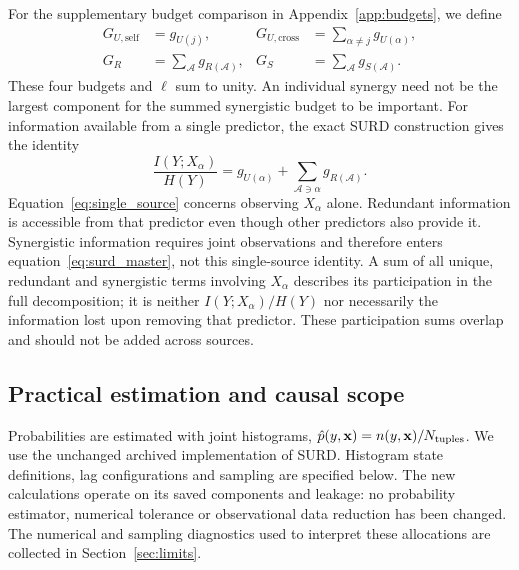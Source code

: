 \documentclass[fleqn,usenatbib]{mnras}
\begin{document}
For the supplementary budget comparison in Appendix~\ref{app:budgets}, we define
\begin{equation}
\begin{aligned}
G_{U,\mathrm{self}}&=g_{U(j)},&
G_{U,\mathrm{cross}}&=\sum_{\alpha\ne j}g_{U(\alpha)},\\
G_R&=\sum_{\mathcal{A}}g_{R(\mathcal{A})},&
G_S&=\sum_{\mathcal{A}}g_{S(\mathcal{A})}.
\end{aligned}
\label{eq:budgets}
\end{equation}
These four budgets and $\ell$ sum to unity. An individual synergy need not be the largest component for the summed synergistic budget to be important. For information available from a single predictor, the exact SURD construction gives the identity \citep[equation~3.22]{MartinezSanchez2025Thesis}
\begin{equation}
\frac{I(Y;X_\alpha)}{H(Y)}
=g_{U(\alpha)}+\sum_{\mathcal{A}\ni\alpha}g_{R(\mathcal{A})}.
\label{eq:single_source}
\end{equation}
Equation~\eqref{eq:single_source} concerns observing $X_\alpha$ alone. Redundant information is accessible from that predictor even though other predictors also provide it. Synergistic information requires joint observations and therefore enters equation~\eqref{eq:surd_master}, not this single-source identity. A sum of all unique, redundant and synergistic terms involving $X_\alpha$ describes its participation in the full decomposition; it is neither $I(Y;X_\alpha)/H(Y)$ nor necessarily the information lost upon removing that predictor. These participation sums overlap and should not be added across sources.

\subsection{Practical estimation and causal scope}
Probabilities are estimated with joint histograms, $\hat p(y,\mathbf{x})=n(y,\mathbf{x})/N_{\rm tuples}$. We use the unchanged archived implementation of SURD. Histogram state definitions, lag configurations and sampling are specified below. The new calculations operate on its saved components and leakage: no probability estimator, numerical tolerance or observational data reduction has been changed. The numerical and sampling diagnostics used to interpret these allocations are collected in Section~\ref{sec:limits}.
\end{document}
